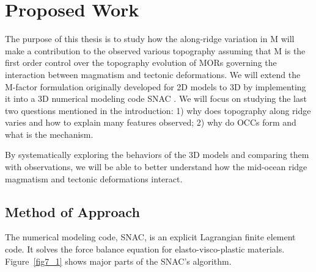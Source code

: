 \documentclass[12pt]{article}
\begin{document}
\break
\section{Proposed Work}
\label{ch:purpose}

The purpose of this thesis is to study how the along-ridge variation in M will make a contribution to the observed various topography assuming that M is the first order control over the topography evolution of MORs governing the interaction between magmatism and tectonic deformations.
We will extend the M-factor formulation originally developed for 2D models to 3D by implementing it into a 3D numerical modeling code SNAC \citep{Choi2008}. We will focus on studying the last two questions mentioned in the introduction: 1) why does topography along ridge varies and how to explain many features observed; 2) why do OCCs form and what is the mechanism. 

By systematically exploring the behaviors of the 3D models and comparing them with observations, we will be able to better understand  how the mid-ocean ridge magmatism and tectonic deformations interact. 

\subsection{Method of Approach}
\label{ch:method}

%

The numerical modeling code, SNAC, is an explicit Lagrangian finite element code. It solves the force balance equation for elasto-visco-plastic materials. Figure~\ref{fig7_1} shows major parts of the SNAC's algorithm. 
\end{document}
